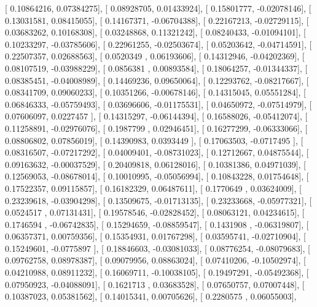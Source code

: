 \documentclass{article}
\begin{document}
       [ 0.10864216,  0.07384275],
       [ 0.08928705,  0.01433924],
       [ 0.15801777, -0.02078146],
       [ 0.13031581,  0.08415055],
       [ 0.14167371, -0.06704388],
       [ 0.22167213, -0.02729115],
       [ 0.03683262,  0.10168308],
       [ 0.03248868,  0.11321242],
       [ 0.08240433, -0.01094101],
       [ 0.10233297, -0.03785606],
       [ 0.22961255, -0.02503674],
       [ 0.05203642, -0.04714591],
       [ 0.22507357,  0.02688563],
       [ 0.0520349 ,  0.06193606],
       [ 0.14312946, -0.04202369],
       [ 0.08107519, -0.03988229],
       [ 0.0856381 ,  0.00893584],
       [ 0.18064257, -0.01344337],
       [ 0.08385451, -0.04008989],
       [ 0.14469236,  0.09650064],
       [ 0.12293762, -0.08217667],
       [ 0.08341709,  0.09060233],
       [ 0.10351266, -0.00678146],
       [ 0.14315045,  0.05551284],
       [ 0.06846333, -0.05759493],
       [ 0.03696606, -0.01175531],
       [ 0.04650972, -0.07514979],
       [ 0.07606097,  0.0227457 ],
       [ 0.14315297, -0.06144394],
       [ 0.16588026, -0.05412074],
       [ 0.11258891, -0.02976076],
       [ 0.1987799 ,  0.02946451],
       [ 0.16277299, -0.06333066],
       [ 0.08806802,  0.07856019],
       [ 0.14390983,  0.0393449 ],
       [ 0.17063503, -0.0717495 ],
       [ 0.08316507, -0.07217292],
       [ 0.04009401, -0.08731023],
       [ 0.12712667,  0.04875544],
       [ 0.09163632, -0.00037529],
       [ 0.20409818,  0.06128016],
       [ 0.10381386,  0.04971039],
       [ 0.12569053, -0.08678014],
       [ 0.10010995, -0.05056994],
       [ 0.10843228,  0.01754648],
       [ 0.17522357,  0.09115857],
       [ 0.16182329,  0.06487611],
       [ 0.1770649 ,  0.03624009],
       [ 0.23239618, -0.03904298],
       [ 0.13509675, -0.01713135],
       [ 0.23233668, -0.05977321],
       [ 0.0524517 ,  0.07131431],
       [ 0.19578546, -0.02828452],
       [ 0.08063121,  0.04234615],
       [ 0.1746594 , -0.06742835],
       [ 0.15294659, -0.08859547],
       [ 0.1431908 , -0.06319807],
       [ 0.06357371,  0.00759356],
       [ 0.15354931,  0.01767298],
       [ 0.03595741, -0.02710904],
       [ 0.15249601, -0.0775897 ],
       [ 0.18846603, -0.03081033],
       [ 0.08776254, -0.08079683],
       [ 0.09762758,  0.08978387],
       [ 0.09079956,  0.08863024],
       [ 0.07410206, -0.10502974],
       [ 0.04210988,  0.08911232],
       [ 0.16069711, -0.10038105],
       [ 0.19497291, -0.05492368],
       [ 0.07950923, -0.04088091],
       [ 0.1621713 ,  0.03683528],
       [ 0.07650757,  0.07007448],
       [ 0.10387023,  0.05381562],
       [ 0.14015341,  0.00705626],
       [ 0.2280575 ,  0.06055003],
\end{document}
